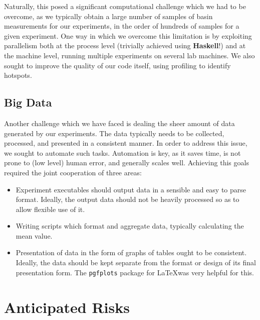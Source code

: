 Naturally, this posed a significant computational challenge which we had to be overcome, as we typically obtain a large number of samples of basin measurements for our experiments, in the order of hundreds of samples for a given experiment. One way in which we overcome this limitation is by exploiting parallelism both at the process level (trivially achieved using \textbf{Haskell}!) and at the machine level, running multiple experiments on several lab machines. We also sought to improve the quality of our code itself, using profiling to identify hotspots. 


\subsection{Big Data}

Another challenge which we have faced is dealing the sheer amount of data generated by our experiments. The data typically needs to be collected, processed, and presented in a consistent manner. In order to address this issue, we sought to automate such tasks. Automation is key, as it saves time, is not prone to (low level) human error, and generally scales well. Achieving this goals required the joint cooperation of three areas:

\begin{itemize}
\item Experiment executables should output data in a sensible and easy to parse format. Ideally, the output data should not be heavily processed so as to allow flexible use of it.

\item Writing scripts which format and aggregate data, typically calculating the mean value.

\item Presentation of data in the form of graphs of tables ought to be consistent. Ideally, the data should be kept separate from the format or design of its final presentation form. The \texttt{pgfplots} package for \LaTeX was very helpful for this.
\end{itemize}



\section{Anticipated Risks}

